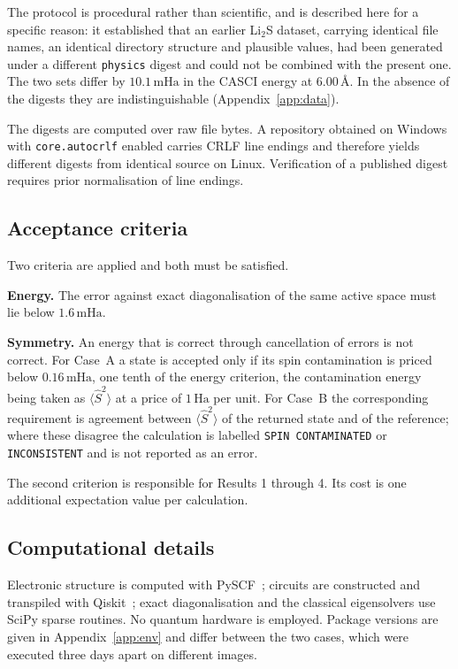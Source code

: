 \documentclass[11pt,a4paper]{article}
\newcommand{\mHa}{\ensuremath{\,\mathrm{mHa}}}
\newcommand{\Ha}{\ensuremath{\,\mathrm{Ha}}}
\newcommand{\Ang}{\ensuremath{\,\text{\AA}}}
\newcommand{\Ssq}{\ensuremath{\langle \hat{S}^2 \rangle}}
\newcommand{\code}[1]{\texttt{\small #1}}
\newcommand{\LiS}{\texorpdfstring{Li$_2$S}{Li2S}}
\begin{document}
The protocol is procedural rather than scientific, and is described here for a
specific reason: it established that an earlier \LiS{} dataset, carrying
identical file names, an identical directory structure and plausible values,
had been generated under a different \code{physics} digest and could not be
combined with the present one. The two sets differ by $10.1\mHa$ in the CASCI
energy at $6.00\Ang$. In the absence of the digests they are indistinguishable
(Appendix~\ref{app:data}).

\begin{caution}
The digests are computed over raw file bytes. A repository obtained on Windows
with \code{core.autocrlf} enabled carries CRLF line endings and therefore yields
different digests from identical source on Linux. Verification of a published
digest requires prior normalisation of line endings.
\end{caution}

\subsection{Acceptance criteria}
\label{sec:methods:criteria}

Two criteria are applied and both must be satisfied.

\textbf{Energy.} The error against exact diagonalisation of the same active
space must lie below $1.6\mHa$.

\textbf{Symmetry.} An energy that is correct through cancellation of errors is
not correct. For Case~A a state is accepted only if its spin contamination is
priced below $0.16\mHa$, one tenth of the energy criterion, the contamination
energy being taken as $\Ssq$ at a price of $1\Ha$ per unit. For Case~B the
corresponding requirement is agreement between $\Ssq$ of the returned state and
of the reference; where these disagree the calculation is labelled
\code{SPIN CONTAMINATED} or \code{INCONSISTENT} and is not reported as an
error.

The second criterion is responsible for Results 1 through 4. Its cost is one
additional expectation value per calculation.

\subsection{Computational details}

Electronic structure is computed with PySCF~\cite{pyscf}; circuits are
constructed and transpiled with Qiskit~\cite{qiskit}; exact diagonalisation and
the classical eigensolvers use SciPy sparse routines. No quantum hardware is
employed. Package versions are given in Appendix~\ref{app:env} and differ
between the two cases, which were executed three days apart on different
images.
\end{document}
